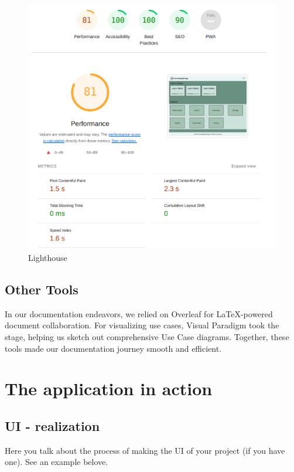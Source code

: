 \documentclass[12pt,a4paper]{article}
\begin{document}
\begin{spacing}{1.5}
    \begin{figure}[H]
        \centering
        \includegraphics[width=0.8\linewidth]{assets/KnowledgeBridgeLighthouse.png}
        \caption{Lighthouse}
        \label{fig:lighthouse}
    \end{figure}
    \FloatBarrier

    \subsection{Other Tools}
    In our documentation endeavors, we relied on Overleaf for LaTeX-powered
    document collaboration. For visualizing use cases, Visual Paradigm took the
    stage, helping us sketch out comprehensive Use Case diagrams. Together, these
    tools made our documentation journey smooth and efficient.

    \section{The application in action}
    \subsection{UI - realization}

    Here you talk about the process of making the UI of your project (if you have
    one). See an example belove.


\end{spacing}
\end{document}

